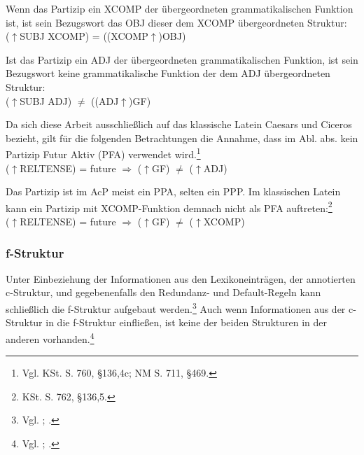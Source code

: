 \documentclass[12pt,a4paper]{article}
\begin{document}
Wenn das Partizip ein XCOMP der übergeordneten grammatikalischen Funktion ist, ist sein Bezugswort das OBJ dieser dem XCOMP übergeordneten Struktur: \\
($\uparrow$SUBJ XCOMP) = ((XCOMP$\uparrow$)OBJ)

Ist das Partizip ein ADJ der übergeordneten grammatikalischen Funktion, ist sein Bezugswort keine grammatikalische Funktion der dem ADJ übergeordneten Struktur: \\
($\uparrow$SUBJ ADJ) $\neq$ ((ADJ$\uparrow$)GF)

Da sich diese Arbeit ausschließlich auf das klassische Latein Caesars und Ciceros bezieht, gilt für die folgenden Betrachtungen die Annahme, dass im Abl. abs. kein Partizip Futur Aktiv (PFA) verwendet wird.\footnote{Vgl. KSt. S. 760, §136,4c; NM S. 711, §469.}\\
($\uparrow$RELTENSE) = future $\Rightarrow$ ($\uparrow$GF) $\neq$ ($\uparrow$ADJ)

Das Partizip ist im AcP meist ein PPA, selten ein PPP. Im klassischen Latein kann ein Partizip mit XCOMP-Funktion demnach nicht als PFA auftreten:\footnote{KSt. S. 762, §136,5.} \\
($\uparrow$RELTENSE) = future $\Rightarrow$ ($\uparrow$GF) $\neq$ ($\uparrow$XCOMP)

\subsubsection{f-Struktur}
Unter Einbeziehung der Informationen aus den Lexikoneinträgen, der annotierten c-Struktur, und gegebenenfalls den Redundanz- und Default-Regeln kann schließlich die f-Struktur aufgebaut werden.\footnote{Vgl. \cite[13; 23]{Rohrer}; \cite[14]{Skript}.} Auch wenn Informationen aus der c-Struktur in die f-Struktur einfließen, ist keine der beiden Strukturen in der anderen vorhanden.\footnote{Vgl. \cite[26-7; 35]{Rohrer}; \cite[8]{Skript}.}
\end{document}

